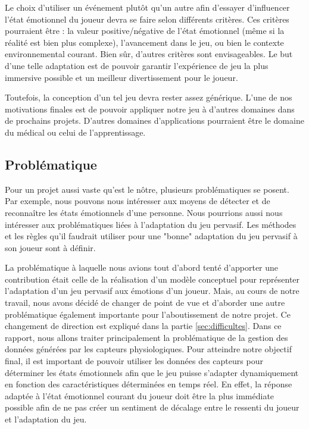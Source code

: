 \documentclass[11pt]{article}
\begin{document}
		Le choix d'utiliser un événement plutôt qu'un autre afin d'essayer d'influencer l'état émotionnel du joueur devra se faire selon différents critères.
		Ces critères pourraient être : la valeur positive/négative de l'état émotionnel (même si la réalité est bien plus complexe), l'avancement dans le jeu, ou bien le contexte environnemental courant.
		Bien sûr, d'autres critères sont envisageables.
		Le but d'une telle adaptation est de pouvoir garantir l'expérience de jeu la plus immersive possible et un meilleur divertissement pour le joueur.\par
		Toutefois, la conception d'un tel jeu devra rester assez générique.
		L'une de nos motivations finales est de pouvoir appliquer notre jeu à d'autres domaines dans de prochains projets.
		D'autres domaines d'applications pourraient être le domaine du médical ou celui de l'apprentissage.
	\subsection{Problématique}\label{sec:problematique}
		Pour un projet aussi vaste qu'est le nôtre, plusieurs problématiques se posent.
		Par exemple, nous pouvons nous intéresser aux moyens de détecter et de reconnaître les états émotionnels d'une personne.
		Nous pourrions aussi nous intéresser aux problématiques liées à l'adaptation du jeu pervasif.
		Les méthodes et les règles qu'il faudrait utiliser pour une "bonne" adaptation du jeu pervasif à son joueur sont à définir.\par
		La problématique à laquelle nous avions tout d'abord tenté d'apporter une contribution était celle de la réalisation d'un modèle conceptuel pour représenter l'adaptation d'un jeu pervasif aux émotions d'un joueur.
		Mais, au cours de notre travail, nous avons décidé de changer de point de vue et d'aborder une autre problématique également importante pour l'aboutissement de notre projet. 
		Ce changement de direction est expliqué dans la partie \ref{sec:difficultes}. 
		Dans ce rapport, nous allons traiter principalement la problématique de la gestion des données générées par les capteurs physiologiques.
		Pour atteindre notre objectif final, il est important de pouvoir utiliser les données des capteurs pour déterminer les états émotionnels afin que le jeu puisse s'adapter dynamiquement en fonction des caractéristiques déterminées en temps réel.
		En effet, la réponse adaptée à l'état émotionnel courant du joueur doit être la plus immédiate possible afin de ne pas créer un sentiment de décalage entre le ressenti du joueur et l'adaptation du jeu.
\end{document}
